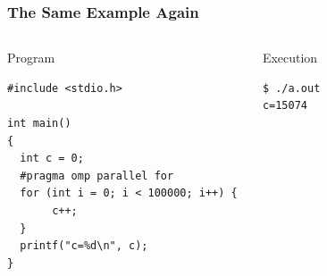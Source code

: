 \documentclass{beamer}
\begin{document}
\begin{frame}[fragile=singleslide]
  \frametitle{The Same Example Again}

  \begin{columns}[t]
  \column{5.5cm}
\begin{block}{Program}
\begin{verbatim}
#include <stdio.h>
  
int main()
{
  int c = 0;
  #pragma omp parallel for
  for (int i = 0; i < 100000; i++) { 
       c++; 
  }
  printf("c=%d\n", c);
}
\end{verbatim}
\end{block}
    
    
    \column{4.5cm}
\begin{block}{Execution}
\footnotesize
\begin{verbatim}
$ ./a.out
c=15074
\end{verbatim}
\end{block}    
  \end{columns}
\end{frame}
\end{document}
